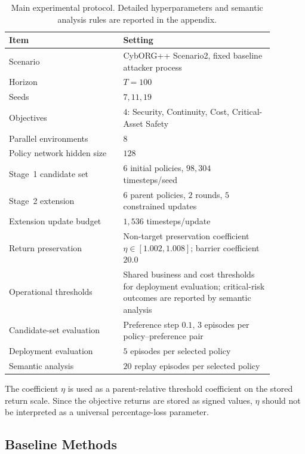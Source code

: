 \documentclass[sigconf,review,anonymous]{acmart}
\begin{document}
\begin{table}[t]
\centering
\small
\caption{Main experimental protocol. Detailed hyperparameters and semantic analysis rules are reported in the appendix.}
\label{tab:eval-protocol}
\begin{tabular}{p{0.38\linewidth}p{0.50\linewidth}}
\toprule
Item & Setting \\
\midrule
Scenario & CybORG++ Scenario2, fixed baseline attacker process \\
Horizon & \(T=100\) \\
Seeds & \(7, 11, 19\) \\
Objectives & \(4\): Security, Continuity, Cost, Critical-Asset Safety \\
Parallel environments & \(8\) \\
Policy network hidden size & \(128\) \\
Stage~1 candidate set & \(6\) initial policies, \(98{,}304\) timesteps/seed \\
Stage~2 extension & \(6\) parent policies, \(2\) rounds, \(5\) constrained updates \\
Extension update budget & \(1{,}536\) timesteps/update \\
Return preservation & Non-target preservation coefficient \(\eta\in[1.002,1.008]\); barrier coefficient \(20.0\)\\
Operational thresholds & Shared business and cost thresholds for deployment evaluation; critical-risk outcomes are reported by semantic analysis \\
Candidate-set evaluation & Preference step \(0.1\), \(3\) episodes per policy--preference pair \\
Deployment evaluation & \(5\) episodes per selected policy \\
Semantic analysis & \(20\) replay episodes per selected policy \\
\bottomrule
\end{tabular}
\end{table}

The coefficient \(\eta\) is used as a parent-relative threshold
coefficient on the stored return scale. Since the objective returns are
stored as signed values, \(\eta\) should not be interpreted as a universal
percentage-loss parameter.

\subsection{Baseline Methods}
\label{subsec:eval-methods}
\end{document}
